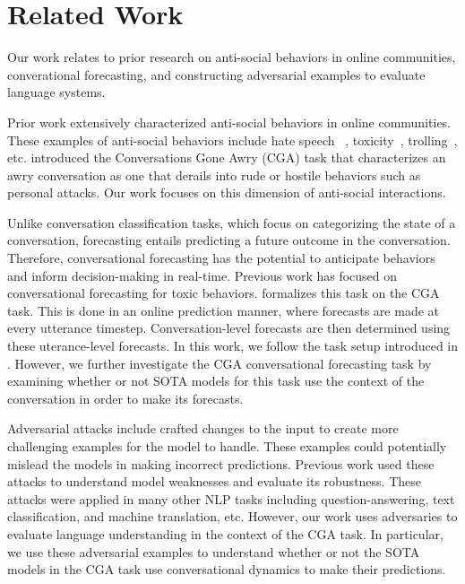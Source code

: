 \section{Related Work}
Our work relates to prior research on anti-social behaviors in online 
communities, converational forecasting, and constructing adversarial examples
to evaluate language systems.

Prior work extensively characterized anti-social behaviors in online communities.
%
These examples of anti-social behaviors include hate speech ~\citep{}, 
toxicity~\citep{}, trolling~\citep{}, etc. 
%
\citep{zhang-etal-2018-conversations} introduced the Conversations Gone Awry (CGA)
task that characterizes an awry conversation as one that derails into rude or 
hostile behaviors such as personal attacks. 
%
Our work focuses on this dimension of anti-social interactions.

Unlike conversation classification tasks, which focus on categorizing the state of 
a conversation, forecasting entails predicting a future outcome in the conversation. 
%
Therefore, conversational forecasting has the potential to anticipate behaviors 
and inform decision-making in real-time.
%
Previous work has focused on conversational forecasting for toxic behaviors\cite{}. 
%
\cite{chang-danescu-niculescu-mizil-2019-trouble} formalizes this task on the CGA 
task. 
%
This is done in an online prediction manner, where forecasts are made at every 
utterance timestep.
%
Conversation-level forecasts are then determined using these uterance-level forecasts.
%
In this work, we follow the task setup introduced in 
\cite{chang-danescu-niculescu-mizil-2019-trouble}.
%
However, we further investigate the CGA conversational forecasting task 
by examining whether or not SOTA models for this task use the context of 
the conversation in order to make its forecasts.


Adversarial attacks include crafted changes to the input to create more challenging
examples for the model to handle.
%
These examples could potentially mislead the models in making incorrect predictions.
%
Previous work used these attacks to understand model weaknesses and evaluate its 
robustness.
%
These attacks were applied in many other NLP tasks including question-answering\citep{}, 
text classification\cite{}, and machine translation\cite{}, etc.
%
However, our work uses adversaries to evaluate language understanding in the context of 
the CGA task. 
%
In particular, we use these adversarial examples to understand whether or not the 
SOTA models in the CGA task use conversational dynamics to make their predictions.
